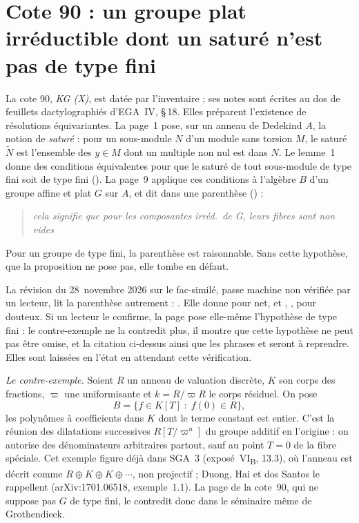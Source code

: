 \section[Cote 90 : un groupe plat irréductible dont un saturé n'est pas de type fini]{Cote 90 : un groupe plat irréductible dont un saturé n'est pas de type fini\protect{}}\label{sec:90}

La cote 90, \emph{KG (X)}, est datée par l'inventaire  ; ses notes sont écrites au dos de feuillets dactylographiés d'EGA~IV, §\,18. Elles préparent l'existence de résolutions équivariantes. La page~1 pose, sur un anneau de Dedekind $A$, la notion de \emph{saturé} : pour un sous-module $N$ d'un module sans torsion $M$, le saturé $\widetilde N$ est l'ensemble des $y \in M$ dont un multiple non nul est dans $N$. Le lemme~1 donne des conditions équivalentes pour que le saturé de tout sous-module de type fini soit de type fini (). La page~9 applique ces conditions à l'algèbre $B$ d'un groupe affine et plat $G$ sur $A$, et dit dans une parenthèse () :

\begin{quote}
\emph{cela signifie que pour les composantes irréd.\ de G, leurs fibres sont non vides}
\end{quote}

\noindent Pour un groupe de type fini, la parenthèse est raisonnable. Sans cette hypothèse, que la proposition ne pose pas, elle tombe en défaut.

\begin{remarque}
La révision du 28~novembre 2026 sur le fac-similé, passe machine non vérifiée par un lecteur, lit la parenthèse autrement : . Elle donne  pour net, et , ,  pour douteux. Si un lecteur le confirme, la page pose elle-même l'hypothèse de type fini : le contre-exemple ne la contredit plus, il montre que cette hypothèse ne peut pas être omise, et la citation ci-dessus ainsi que les phrases  et  seront à reprendre. Elles sont laissées en l'état en attendant cette vérification.
\end{remarque}

\noindent\emph{Le contre-exemple.} Soient $R$ un anneau de valuation discrète, $K$ son corps des fractions, $\varpi$ une uniformisante et $k = R/\varpi R$ le corps résiduel. On pose
\[
B = \{ f \in K[T] \;:\; f(0) \in R \},
\]
les polynômes à coefficients dans $K$ dont le terme constant est entier. C'est la réunion des dilatations successives $R[T/\varpi^n]$ du groupe additif en l'origine : on autorise des dénominateurs arbitraires partout, sauf au point $T = 0$ de la fibre spéciale. Cet exemple figure déjà dans SGA~3 (exposé~VI\textsubscript{B}, 13.3), où l'anneau est décrit comme $R \oplus K \oplus K \oplus \cdots$, non projectif ; Duong, Hai et dos Santos le rappellent (arXiv:1701.06518, exemple~1.1). La page de la cote~90, qui ne suppose pas $G$ de type fini, le contredit donc dans le séminaire même de Grothendieck.

